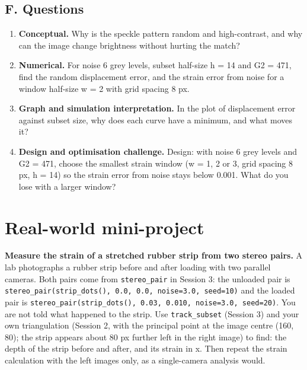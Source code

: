 \documentclass[11pt,a4paper]{article}
\begin{document}
\subsection*{F. Questions}
\begin{enumerate}[nosep]
\item \textbf{Conceptual.} Why is the speckle pattern random and high-contrast, and why can the image change brightness without hurting the match?
\item \textbf{Numerical.} For noise 6 grey levels, subset half-size h = 14 and G2 = 471, find the random displacement error, and the strain error from noise for a window half-size w = 2 with grid spacing 8 px.
\item \textbf{Graph and simulation interpretation.} In the plot of displacement error against subset size, why does each curve have a minimum, and what moves it?
\item \textbf{Design and optimisation challenge.} Design: with noise 6 grey levels and G2 = 471, choose the smallest strain window (w = 1, 2 or 3, grid spacing 8 px, h = 14) so the strain error from noise stays below 0.001. What do you lose with a larger window?
\end{enumerate}

\section{Real-world mini-project}
\textbf{Measure the strain of a stretched rubber strip from two stereo pairs.} A lab photographs a rubber strip before and after loading with two parallel cameras. Both pairs come from \texttt{stereo\_pair} in Session 3: the unloaded pair is \texttt{stereo\_pair(strip\_dots(), 0.0, 0.0, noise=3.0, seed=10)} and the loaded pair is \texttt{stereo\_pair(strip\_dots(), 0.03, 0.010, noise=3.0, seed=20)}. You are not told what happened to the strip. Use \texttt{track\_subset} (Session 3) and your own triangulation (Session 2, with the principal point at the image centre (160, 80); the strip appears about 80 px further left in the right image) to find: the depth of the strip before and after, and its strain in x. Then repeat the strain calculation with the left images only, as a single-camera analysis would.
\end{document}
